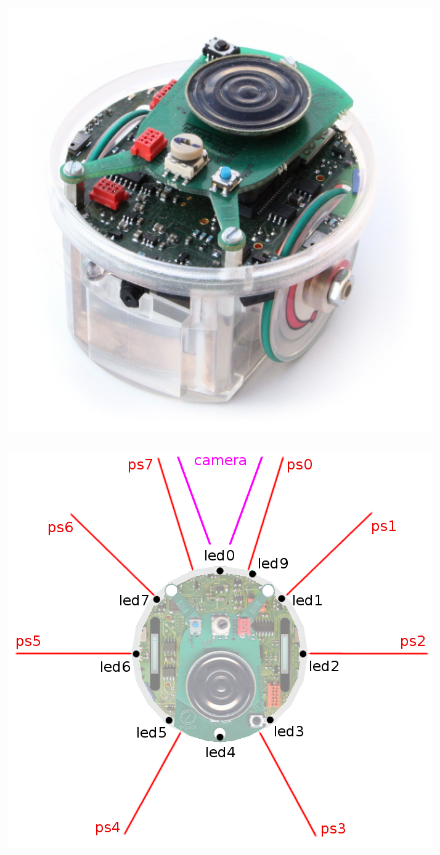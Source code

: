 \begin{figure}[!b]
	\centering
	\begin{minipage}{.5\textwidth}
		\centering
		\includegraphics[width=.75\linewidth]{epuck}
		\label{fig:epuck-pic}
	\end{minipage}%
	\begin{minipage}{.5\textwidth}
		\centering
		\includegraphics[width=1\linewidth]{e-puck_sensors_and_leds}
		\label{fig:epuck-sensors}
	\end{minipage}
\end{figure}

